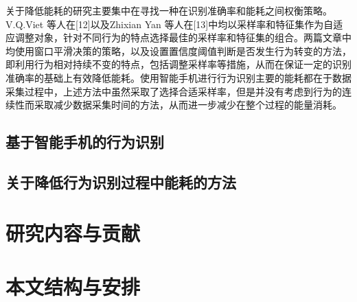 \par 关于降低能耗的研究主要集中在寻找一种在识别准确率和能耗之间权衡策略。V.Q.Viet 等人在[12]以及Zhixian Yan 等人在[13]中均以采样率和特征集作为自适应调整对象，针对不同行为的特点选择最佳的采样率和特征集的组合。两篇文章中均使用窗口平滑决策的策略，以及设置置信度阈值判断是否发生行为转变的方法，即利用行为相对持续不变的特点，包括调整采样率等措施，从而在保证一定的识别准确率的基础上有效降低能耗。使用智能手机进行行为识别主要的能耗都在于数据采集过程中，上述方法中虽然采取了选择合适采样率，但是并没有考虑到行为的连续性而采取减少数据采集时间的方法，从而进一步减少在整个过程的能量消耗。

\subsection{基于智能手机的行为识别}

\subsection{关于降低行为识别过程中能耗的方法}

\section{研究内容与贡献}

\section{本文结构与安排}